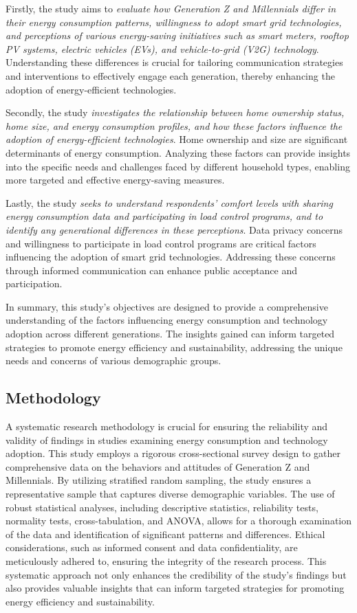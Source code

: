 \documentclass[
  letterpaper,
  DIV=11,
  numbers=noendperiod]{scrartcl}
\begin{document}
Firstly, the study aims to \emph{evaluate how Generation Z and
Millennials differ in their energy consumption patterns, willingness to
adopt smart grid technologies, and perceptions of various energy-saving
initiatives such as smart meters, rooftop PV systems, electric vehicles
(EVs), and vehicle-to-grid (V2G) technology}. Understanding these
differences is crucial for tailoring communication strategies and
interventions to effectively engage each generation, thereby enhancing
the adoption of energy-efficient technologies.

Secondly, the study \emph{investigates the relationship between home
ownership status, home size, and energy consumption profiles, and how
these factors influence the adoption of energy-efficient technologies}.
Home ownership and size are significant determinants of energy
consumption. Analyzing these factors can provide insights into the
specific needs and challenges faced by different household types,
enabling more targeted and effective energy-saving measures.

Lastly, the study \emph{seeks to understand respondents' comfort levels
with sharing energy consumption data and participating in load control
programs, and to identify any generational differences in these
perceptions}. Data privacy concerns and willingness to participate in
load control programs are critical factors influencing the adoption of
smart grid technologies. Addressing these concerns through informed
communication can enhance public acceptance and participation.

In summary, this study's objectives are designed to provide a
comprehensive understanding of the factors influencing energy
consumption and technology adoption across different generations. The
insights gained can inform targeted strategies to promote energy
efficiency and sustainability, addressing the unique needs and concerns
of various demographic groups.

\subsection{Methodology}\label{methodology}

A systematic research methodology is crucial for ensuring the
reliability and validity of findings in studies examining energy
consumption and technology adoption. This study employs a rigorous
cross-sectional survey design to gather comprehensive data on the
behaviors and attitudes of Generation Z and Millennials. By utilizing
stratified random sampling, the study ensures a representative sample
that captures diverse demographic variables. The use of robust
statistical analyses, including descriptive statistics, reliability
tests, normality tests, cross-tabulation, and ANOVA, allows for a
thorough examination of the data and identification of significant
patterns and differences. Ethical considerations, such as informed
consent and data confidentiality, are meticulously adhered to, ensuring
the integrity of the research process. This systematic approach not only
enhances the credibility of the study's findings but also provides
valuable insights that can inform targeted strategies for promoting
energy efficiency and sustainability.
\end{document}
